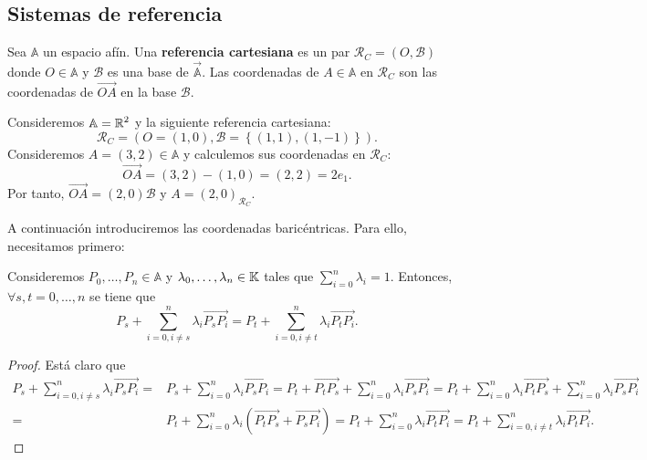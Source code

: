 \subsection{Sistemas de referencia}
\begin{definition}
Sea $\displaystyle \mathbb{A} $ un espacio afín. Una \textbf{referencia cartesiana} es un par $\displaystyle \mathcal{R}_{C}= \left(O,\mathcal{B}\right) $ donde $\displaystyle O \in \mathbb{A} $ y $\displaystyle \mathcal{B} $ es una base de $\displaystyle \vec{\mathbb{A}} $. Las coordenadas de $\displaystyle A \in \mathbb{A} $ en $\displaystyle \mathcal{R}_{C} $ son las coordenadas de $\displaystyle \overrightarrow{OA} $ en la base $\displaystyle \mathcal{B} $.
\end{definition}
\begin{eg}
Consideremos $\displaystyle \mathbb{A} = \mathbb{R}^{2} $ y la siguiente referencia cartesiana:
\[ \mathcal{R}_{C} = \left( O = \left(1,0\right), \mathcal{B} = \left\{ \left(1,1\right), \left(1,-1\right)\right\} \right) .\]
Consideremos $\displaystyle A = \left(3,2\right) \in \mathbb{A} $ y calculemos sus coordenadas en $\displaystyle \mathcal{R}_{C} $:
\[\overrightarrow{OA} = \left(3,2\right)-\left(1,0\right) = \left(2,2\right) = 2e_{1} .\]
Por tanto, $\displaystyle \overrightarrow{OA} = \left(2,0\right)\mathcal{B} $ y $\displaystyle A = \left(2,0\right)_{\mathcal{R}_{C}} $.
\end{eg}
A continuación introduciremos las coordenadas baricéntricas. Para ello, necesitamos primero:
\begin{prop}
Consideremos $\displaystyle P_{0}, \ldots, P_{n} \in \mathbb{A} $ y $\displaystyle \lambda_{0}, \ldots, \lambda_{n} \in \mathbb{K} $ tales que $\displaystyle \sum^{n}_{i = 0}\lambda_{i} = 1 $. Entonces, $\displaystyle \forall s,t = 0, \ldots, n $ se tiene que 
\[P_{s} + \sum^{n}_{i = 0, i \neq s}\lambda_{i}\overrightarrow{P_{s}P_{i}} = P_{t} + \sum^{n}_{i = 0, i \neq t}\lambda_{i}\overrightarrow{P_{t}P_{i}} .\]
\end{prop}
\begin{proof}
Está claro que
\[
\begin{split}
	P_{s} + \sum^{n}_{i = 0, i \neq s}\lambda_{i}\overrightarrow{P_{s}P_{i}} = & P_{s} +\sum^{n}_{i = 0}\lambda_{i}\overrightarrow{P_{s}P_{i}} = P_{t} + \overrightarrow{P_{t}P_{s}} + \sum^{n}_{i = 0}\lambda_{i}\overrightarrow{P_{s}P_{i}} = P_{t} +\sum^{n}_{i = 0}\lambda_{i}\overrightarrow{P_{t}P_{s}} + \sum^{n}_{i = 0}\lambda_{i}\overrightarrow{P_{s}P_{i}} \\
	= & P_{t} + \sum^{n}_{i = 0}\lambda_{i}\left(\overrightarrow{P_{t}P_{s}} + \overrightarrow{P_{s}P_{i}}\right) = P_{t} + \sum^{n}_{i = 0}\lambda_{i}\overrightarrow{P_{t}P_{i}}  = P_{t} + \sum^{n}_{i = 0, i \neq t}\lambda_{i}\overrightarrow{P_{t}P_{i}} .
\end{split}
\]
\end{proof}
